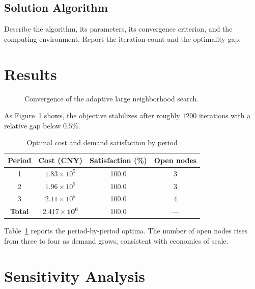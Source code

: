 \documentclass[12pt]{article}
\begin{document}
\subsection{Solution Algorithm}

Describe the algorithm, its parameters, its convergence criterion, and the computing
environment. Report the iteration count and the optimality gap.

\section{Results}
\label{sec:results}

\begin{figure}[htbp]
  \centering
  \caption{Convergence of the adaptive large neighborhood search.}
  \label{fig:convergence}
\end{figure}

As Figure~\ref{fig:convergence} shows, the objective stabilizes after roughly $1200$
iterations with a relative gap below $0.5\%$.

\begin{table}[htbp]
  \centering
  \caption{Optimal cost and demand satisfaction by period}
  \label{tab:results}
  \begin{tabular}{cccc}
    \toprule
    \textbf{Period} & \textbf{Cost (CNY)} & \textbf{Satisfaction (\%)} & \textbf{Open nodes} \\
    \midrule
    1 & $1.83\times10^{5}$ & 100.0 & 3 \\
    2 & $1.96\times10^{5}$ & 100.0 & 3 \\
    3 & $2.11\times10^{5}$ & 100.0 & 4 \\
    \textbf{Total} & $\bm{2.417\times10^{6}}$ & 100.0 & --- \\
    \bottomrule
  \end{tabular}
\end{table}

Table~\ref{tab:results} reports the period-by-period optima. The number of open nodes
rises from three to four as demand grows, consistent with economies of scale.

\section{Sensitivity Analysis}
\label{sec:sensitivity}
\end{document}
